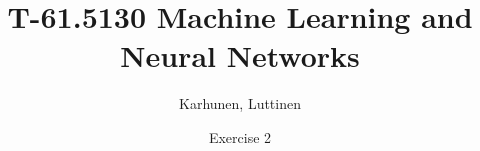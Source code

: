 
\title{T-61.5130 Machine Learning and Neural Networks}
\author{Karhunen, Luttinen}
\date{Exercise 2}

\usepackage{cancel}
\usepackage{listings}

\newcommand{\vect}[1]{{\bf{#1}}}
\newcommand{\svect}[1]{\boldsymbol{#1}}
\newcommand{\matr}[1]{\boldsymbol{#1}}
\newcommand{\vw}{{\bf{w}}}
\newcommand{\ve}{{\bf{e}}}
\newcommand{\vx}{{\bf{x}}}



\maketitle

